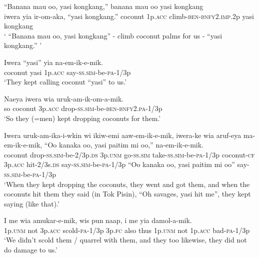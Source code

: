 \ea\label{ex:a:x43}
\gll  “Banana  mau  oo,  yasi  kongkang,” banana  mau  oo  yasi  kongkang\\ 
iwera  yia  ir-om-aka,  “yasi  kongkang.” coconut  1p.\textsc{acc}  climb-\textsc{ben}-\textsc{bnfy}2.\textsc{imp}.2p  yasi  kongkang  \\ 
\glt ‘ “Banana mau oo, yasi kongkang” - climb coconut palms for us - “yasi kongkang.” ’ \\
\z


\ea\label{ex:a:x44}
\gll  Iwera  “yasi”  yia  na-em-ik-e-mik. \\
coconut  yasi  1p.\textsc{acc}  say-\textsc{ss}.\textsc{sim}-be-\textsc{pa}-1/3p \\
\glt ‘They kept calling coconut “yasi” to us.’ \\
\z


\ea\label{ex:a:x45}
\gll  Naeya  iwera  wia  uruk-am-ik-om-a-mik. \\
so  coconut  3p.\textsc{acc}  drop-\textsc{ss}.\textsc{sim}-be-\textsc{ben}-\textsc{bnfy}2.\textsc{pa}-1/3p \\
\glt ‘So they (=men) kept dropping coconuts for them.’ \\
\z


\ea\label{ex:a:x46}
\gll  Iwera  uruk-am-ika-i-wkin  wi  ikiw-emi  aaw-em-ik-e-mik,  iwera-ke  wia  aruf-eya   ma-em-ik-e-mik,  “Oo  kanaka  oo,  yasi  paitim  mi  oo,” na-em-ik-e-mik. \\
coconut  drop-\textsc{ss}.\textsc{sim}-be-2/3p.\textsc{ds}  3p.\textsc{unm}  go-\textsc{ss}.\textsc{sim} take-\textsc{ss}.\textsc{sim}-be-\textsc{pa}-1/3p  coconut-\textsc{cf}  3p.\textsc{acc}  hit-2/3s.\textsc{ds} say-\textsc{ss}.\textsc{sim}-be-\textsc{pa}-1/3p  “Oo  kanaka  oo,  yasi  paitim  mi  oo” say-\textsc{ss}.\textsc{sim}-be-\textsc{pa}-1/3p\\
\glt ‘When they kept dropping the coconuts, they went and got them, and when the coconuts hit them they said (in Tok Pisin), “Oh savages, yasi hit me”, they kept saying (like that).’ \\
\z


\ea\label{ex:a:x47}
\gll  I  me  wia  amukar-e-mik,  wis  pun  naap, i  me  yia  damol-a-mik. \\
1p.\textsc{unm}  not  3p.\textsc{acc}  scold-\textsc{pa}-1/3p  3p.\textsc{fc}  also  thus 1p.\textsc{unm}  not  1p.\textsc{acc}  bad-\textsc{pa}-1/3p \\ 
\glt ‘We didn’t scold them / quarrel with them, and they too likewise, they did not do damage to us.’ \\
\z


